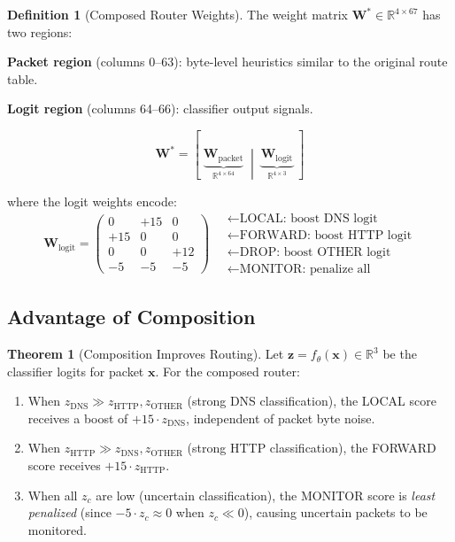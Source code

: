 \documentclass[11pt,a4paper,twoside]{article}
\theoremstyle{definition}
\newtheorem{definition}{Definition}[section]
\newtheorem{theorem}{Theorem}[section]
\theoremstyle{remark}
\newcommand{\R}{\mathbb{R}}
\newcommand{\mat}[1]{\mathbf{#1}}
\newcommand{\vect}[1]{\mathbf{#1}}
\begin{document}
\begin{definition}[Composed Router Weights]
\label{def:composed-weights}
The weight matrix $\mat{W}^* \in \R^{4 \times 67}$ has two regions:

\vspace{0.5em}
\noindent\textbf{Packet region} (columns 0--63): byte-level heuristics similar to the original route table.

\noindent\textbf{Logit region} (columns 64--66): classifier output signals.

\begin{equation}
\mat{W}^* = \left[\;\underbrace{\mat{W}_{\text{packet}}}_{\R^{4 \times 64}}\;\middle|\;\underbrace{\mat{W}_{\text{logit}}}_{\R^{4 \times 3}}\;\right]
\end{equation}

where the logit weights encode:
\begin{equation}
\mat{W}_{\text{logit}} = \begin{pmatrix}
0 & +15 & 0 \\
+15 & 0 & 0 \\
0 & 0 & +12 \\
-5 & -5 & -5
\end{pmatrix}
\quad
\begin{array}{l}
\leftarrow \text{LOCAL: boost DNS logit} \\
\leftarrow \text{FORWARD: boost HTTP logit} \\
\leftarrow \text{DROP: boost OTHER logit} \\
\leftarrow \text{MONITOR: penalize all}
\end{array}
\label{eq:logit-weights}
\end{equation}
\end{definition}

\subsection{Advantage of Composition}

\begin{theorem}[Composition Improves Routing]
\label{thm:composition}
Let $\vect{z} = f_\theta(\vect{x}) \in \R^3$ be the classifier logits for packet $\vect{x}$. For the composed router:
\begin{enumerate}[label=(\roman*)]
  \item When $z_{\text{DNS}} \gg z_{\text{HTTP}}, z_{\text{OTHER}}$ (strong DNS classification), the LOCAL score receives a boost of $+15 \cdot z_{\text{DNS}}$, independent of packet byte noise.
  \item When $z_{\text{HTTP}} \gg z_{\text{DNS}}, z_{\text{OTHER}}$ (strong HTTP classification), the FORWARD score receives $+15 \cdot z_{\text{HTTP}}$.
  \item When all $z_c$ are low (uncertain classification), the MONITOR score is \emph{least penalized} (since $-5 \cdot z_c \approx 0$ when $z_c \ll 0$), causing uncertain packets to be monitored.
\end{enumerate}
\end{theorem}
\end{document}

